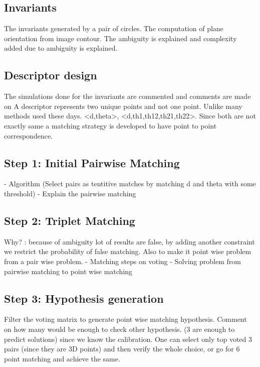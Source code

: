 \documentclass{bmvc2k}
\begin{document}
\subsection{Invariants}
The invariants generated by a pair of circles. 
The computation of plane orientation from image contour. 
The ambiguity is explained and complexity added due to ambiguity is explained. 
\subsection{Descriptor design}
The simulations done for the invariants are commented and comments are made on 
A descriptor represents two unique points and not one point. Unlike many methods used these days. 
<d,theta>, <d,th1,th12,th21,th22>. 
Since both are not exactly same a matching strategy is developed to have point to point correspondence.    
\subsection{Step 1: Initial Pairwise Matching}
- Algorithm (Select pairs as tentitive matches by matching d and theta with some threshold)
- Explain the pairwise matching 
\subsection{Step 2: Triplet Matching}
Why? : because of ambiguity lot of results are false, by adding another constraint we restrict the probability of false matching. Also to make it point wise problem from a pair wise problem. 
- Matching steps on voting 
- Solving problem from pairwise matching to point wise matching
\subsection{Step 3: Hypothesis generation}
Filter the voting matrix to generate point wise matching hypothesis. 
Comment on how many would be enough to check other hypothesis. 
(3 are enough to predict solutions) since we know the calibration. 
One can select only top voted 3 pairs (since they are 3D points) and then verify the whole choice, or go for 6 point matching and achieve the same.

\end{document}
